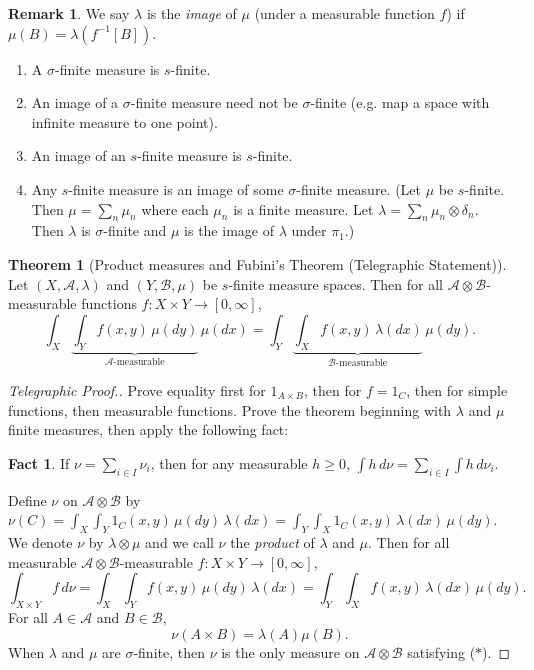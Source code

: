 \documentclass{article}
\theoremstyle{definition}
\newtheorem*{remark}{Remark}
\newtheorem*{fact}{Fact}
\newtheorem*{theorem*}{Theorem}
\begin{document}
\begin{remark}
We say $\lambda$ is the \emph{image} of $\mu$ (under a measurable function $f$) if $\mu(B) = \lambda(f^{-1}[B])$.
\begin{enumerate}
    \item A $\sigma$-finite measure is $s$-finite.
    \item An image of a $\sigma$-finite measure need not be $\sigma$-finite (e.g. map a space with infinite measure to one point).
    \item An image of an $s$-finite measure is $s$-finite.
    \item Any $s$-finite measure is an image of some $\sigma$-finite measure. (Let $\mu$ be $s$-finite. Then $\mu = \sum_n \mu_n$ where each $\mu_n$ is a finite measure. Let $\lambda = \sum_n \mu_n \otimes \delta_n$. Then $\lambda$ is $\sigma$-finite and $\mu$ is the image of $\lambda$ under $\pi_1$.)
\end{enumerate}
\end{remark}

\begin{theorem*}[Product measures and Fubini's Theorem (Telegraphic Statement)]
Let $(X, \mathscr{A}, \lambda)$ and $(Y, \mathscr{B}, \mu)$ be $s$-finite measure spaces. Then for all $\mathscr{A} \otimes \mathscr{B}$-measurable functions $f : X \times Y \to [0,\infty]$,
\[
    \int_X \underbrace{\int_Y f(x,y) \,\mu(dy)}_{\mathscr{A}\text{-measurable}}\,\mu(dx) = \int_Y \underbrace{\int_X f(x,y) \,\lambda(dx)}_{\mathscr{B}\text{-measurable}}\,\mu(dy).
\]
\end{theorem*}

\begin{proof}[Telegraphic Proof.]
    Prove equality first for $1_{A \times B}$, then for $f = 1_C$, then for simple functions, then measurable functions. Prove the theorem beginning with $\lambda$ and $\mu$ finite measures, then apply the following fact:
    
    \begin{fact}
    If $\nu = \sum_{i \in I} \nu_i$, then for any measurable $h \geq 0$, $\int h \,d\nu = \sum_{i \in I} \int h \,d\nu_i$.
    \end{fact}
    
    Define $\nu$ on $\mathscr{A} \otimes \mathscr{B}$ by $\nu(C) = \int_X \int_Y 1_C(x,y)\,\mu(dy)\,\lambda(dx) = \int_Y \int_X 1_C(x,y)\,\lambda(dx)\,\mu(dy)$. We denote $\nu$ by $\lambda \otimes \mu$ and we call $\nu$ the \emph{product} of $\lambda$ and $\mu$. Then for all measurable $\mathscr{A} \otimes \mathscr{B}$-measurable $f : X \times Y \to [0, \infty]$,
    \[
        \int_{X \times Y} f \,d\nu = \int_X \int_Y f(x,y) \,\mu(dy)\,\lambda(dx) = \int_Y \int_X f(x,y) \,\lambda(dx)\,\mu(dy).
    \]
    For all $A \in \mathscr{A}$ and $B \in \mathscr{B}$,
    \begin{equation*}
        \nu(A \times B) = \lambda(A)\mu(B). \tag{$*$}
    \end{equation*}
    When $\lambda$ and $\mu$ are $\sigma$-finite, then $\nu$ is the only measure on $\mathscr{A} \otimes \mathscr{B}$ satisfying ($*$).
\end{proof}
\end{document}
